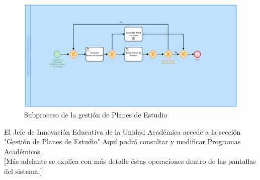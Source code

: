         \begin{figure}[!hbtp]
        	\centering
        	\hypertarget{BPMNGPE}{\includegraphics[width=\linewidth]{images/SP4-GPE/gestionPE.png}}
        	\caption{Subproceso de la gestión de Planes de Estudio}
        	\label{BPMNGPE}
        \end{figure}

        El Jefe de Innovación Educativa de la Unidad Académica accede a la sección "Gestión de Planes de Estudio" Aquí podrá consultar y modificar Programas Académicos. \\

        [Más adelante se explica con más detalle éstas operaciones dentro de las pantallas del sistema.]\\



